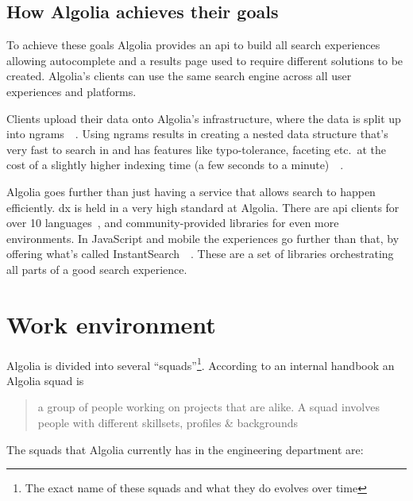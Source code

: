 \subsection{How Algolia achieves their goals}

To achieve these goals Algolia provides an \acrshort{api} to build all search experiences allowing autocomplete and a results page used to require different solutions to be created. Algolia's clients can use the same search engine across all user experiences and platforms.


Clients upload their data onto Algolia's infrastructure, where the data is split up into \glspl{ngram}~\cite{kimbrell1988searching}~. Using \glspl{ngram} results in creating a nested data structure that's very fast to search in and has features like typo-tolerance, faceting etc.\ at the cost of a slightly higher indexing time (a few seconds to a minute)~\cite{paris-nlp-algolia}~.

Algolia goes further than just having a service that allows search to happen efficiently. \Acrfull{dx} is held in a very high standard at Algolia. There are \acrshort{api} clients for over 10 languages~\cite{doc-api-clients}, and community-provided libraries for even more environments. In JavaScript and mobile the experiences go further than that, by offering what's called InstantSearch~\cite{instantsearch-js, react-instantsearch, instantsearch-android, instantsearch-ios}~. These are a set of libraries orchestrating all parts of a good search experience.

\section{Work environment}
\label{sec:work-environment}

Algolia is divided into several ``squads''\footnote{The exact name of these squads and what they do evolves over time}. According to an internal handbook an Algolia squad is

\begin{quotation}
  a group of people working on projects that are alike. A squad involves people with different skillsets, profiles \& backgrounds
\end{quotation}

The squads that Algolia currently has in the engineering department are:

